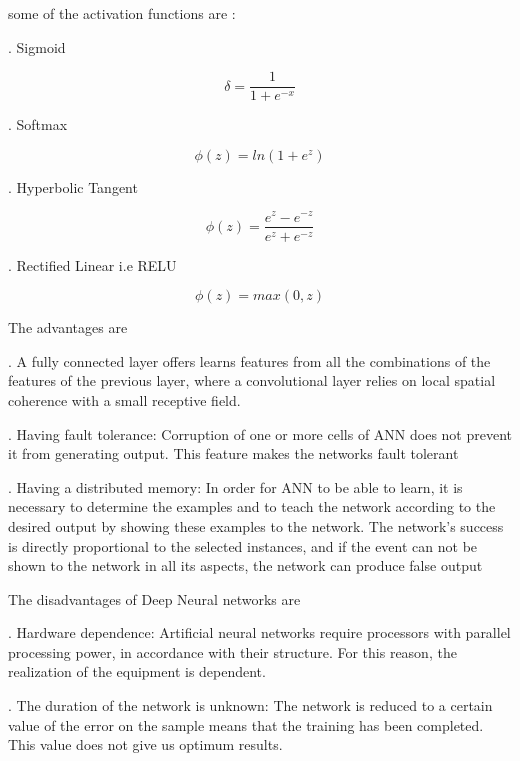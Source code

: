\documentclass[12pt]{article}
\newcommand{\nd}{\noindent}
\begin{document}
\nd some of the activation functions are : 

\nd 1. Sigmoid 

\begin{equation} 
\delta= \frac{1}{1+e^{-x}}
\end{equation}

\nd 2. Softmax

\begin{equation} 
\phi(z)=ln(1+e^z)
\end{equation}

\nd 3. Hyperbolic Tangent 

\begin{equation} 
\phi(z)=\frac{e^z -e^{-z}}{e^z + e^{-z}}
\end{equation}

\nd 4. Rectified Linear i.e RELU 

\begin{equation} 
\phi(z)=max(0,z)
\end{equation}

\nd The advantages are 

\nd 1. A fully connected layer offers learns features from all the combinations of the features of the previous layer, where a convolutional layer relies on local spatial coherence with a small receptive field.

\nd 2. Having fault tolerance:  Corruption of one or more cells of ANN does not prevent it from generating output. This feature makes the networks fault tolerant

\nd 3. Having a distributed memory: In order for ANN to be able to learn, it is necessary to determine the examples and to teach the network according to the desired output by showing these examples to the network. The network's success is directly proportional to the selected instances, and if the event can not be shown to the network in all its aspects, the network can produce false output 

\nd The disadvantages of Deep Neural networks are 

\nd 1. Hardware dependence:  Artificial neural networks require processors with parallel processing power, in accordance with their structure. For this reason, the realization of the equipment is dependent. 

\nd 2.   The duration of the network is unknown: The  network is reduced to a certain value of the error on the sample means that the training has been completed. This value does not give us optimum results. 
\end{document}
